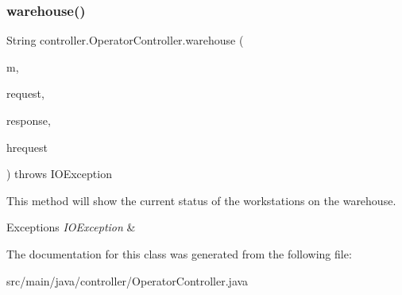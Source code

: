 \subsubsection{\texorpdfstring{warehouse()}{warehouse()}}
{\footnotesize\ttfamily String controller.\+Operator\+Controller.\+warehouse (\begin{DoxyParamCaption}\item[{Model}]{m,  }\item[{Web\+Request}]{request,  }\item[{Http\+Servlet\+Response}]{response,  }\item[{Http\+Servlet\+Request}]{hrequest }\end{DoxyParamCaption}) throws I\+O\+Exception\hspace{0.3cm}{\ttfamily [inline]}}

This method will show the current status of the workstations on the warehouse. 
\begin{DoxyExceptions}{Exceptions}
{\em I\+O\+Exception} & \\
\hline
\end{DoxyExceptions}


The documentation for this class was generated from the following file\+:\begin{DoxyCompactItemize}
\item 
src/main/java/controller/Operator\+Controller.\+java\end{DoxyCompactItemize}
